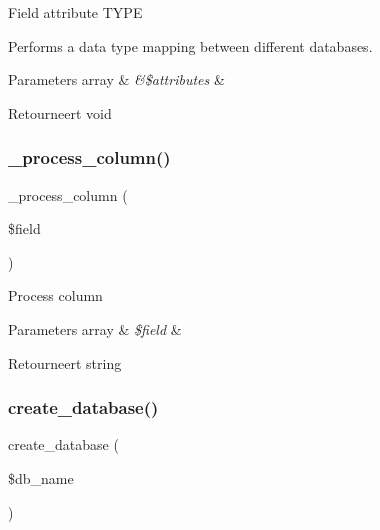 Field attribute T\+Y\+PE

Performs a data type mapping between different databases.


\begin{DoxyParams}[1]{Parameters}
array & {\em \&\$attributes} & \\
\hline
\end{DoxyParams}
\begin{DoxyReturn}{Retourneert}
void 
\end{DoxyReturn}
\mbox{\label{class_c_i___d_b__ibase__forge_a8f38f1c5b5dddecca4befbe393f3f299}} 
\subsubsection{\texorpdfstring{\_process\_column()}{\_process\_column()}}
{\footnotesize\ttfamily \+\_\+process\+\_\+column (\begin{DoxyParamCaption}\item[{}]{\$field }\end{DoxyParamCaption})\hspace{0.3cm}{\ttfamily [protected]}}

Process column


\begin{DoxyParams}[1]{Parameters}
array & {\em \$field} & \\
\hline
\end{DoxyParams}
\begin{DoxyReturn}{Retourneert}
string 
\end{DoxyReturn}
\mbox{\label{class_c_i___d_b__ibase__forge_a902a7267babceb2ce595706f217e00ad}} 
\subsubsection{\texorpdfstring{create\_database()}{create\_database()}}
{\footnotesize\ttfamily create\+\_\+database (\begin{DoxyParamCaption}\item[{}]{\$db\+\_\+name }\end{DoxyParamCaption})}

